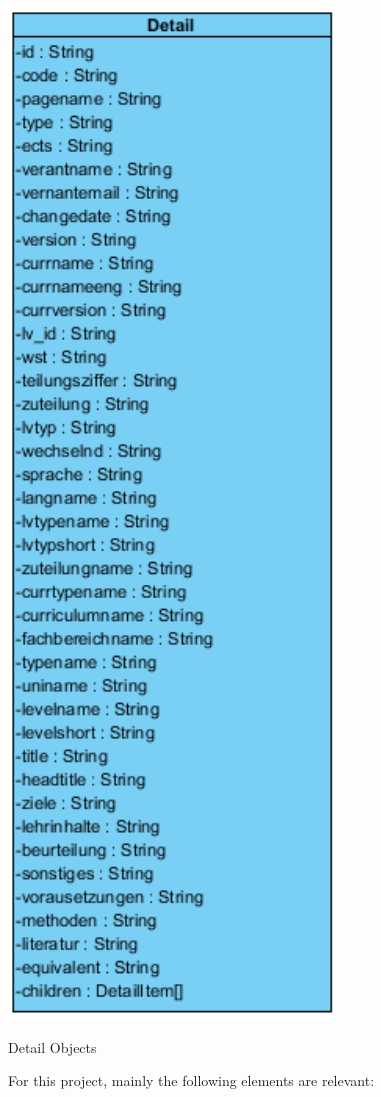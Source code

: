 \begin{DoxyImage}
\includegraphics{Detail}
\caption{Detail Objects}
\end{DoxyImage}
 For this project, mainly the following elements are relevant\+:

